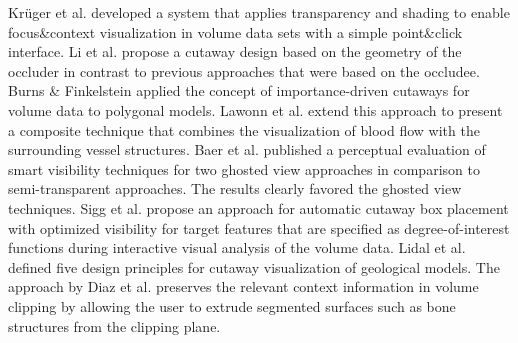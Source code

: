 Kr{\"u}ger et al. \cite{kruger06} developed a system that applies transparency and shading to enable focus\&context visualization in volume data sets with a simple point\&click interface.
Li et al. \cite{Li07} propose a cutaway design based on the geometry of the occluder in contrast to previous approaches that were based on the occludee.
Burns \& Finkelstein \cite{Burns08} applied the concept of importance-driven cutaways for volume data to polygonal models.
Lawonn et al. \cite{lawonn16} extend this approach to present a composite technique that combines the visualization of blood flow with the surrounding vessel structures. %
Baer et al. \cite{baer11} published a perceptual evaluation of smart visibility techniques for two ghosted view approaches in comparison to semi-transparent approaches. The results clearly favored the ghosted view techniques.
Sigg et al. \cite{sigg12} propose an approach for automatic cutaway box placement with optimized visibility for target features that are specified as degree-of-interest functions during interactive visual analysis of the volume data. Lidal et al. \cite{Lidal12} defined five design principles for cutaway visualization of geological models. %
The approach by Diaz et al. \cite{diaz12} preserves the relevant context information in volume clipping by allowing the user to extrude segmented surfaces such as bone structures from the clipping plane.

